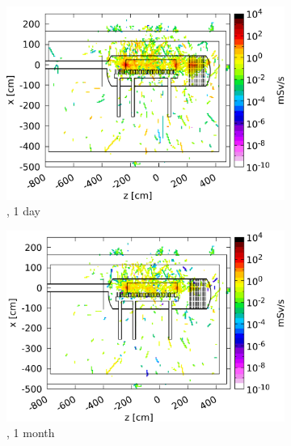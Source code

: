    \begin{figure}[htb]\ContinuedFloat
     \begin{subfigure}[b]{0.49\textwidth}
   \centering
    \includegraphics[width=\textwidth]{Figures/BeamDump/Design1_3.png}
   \caption{\designone, 1 day}
   \end{subfigure}
   \hfill
    \begin{subfigure}[b]{0.49\textwidth}
   \centering
    \includegraphics[width=\textwidth]{Figures/BeamDump/Design1_4.png}
   \caption{\designone, 1 month}
   \end{subfigure}\\
    \begin{subfigure}[b]{0.49\textwidth}
   \centering

\end{subfigure}
\end{figure}
